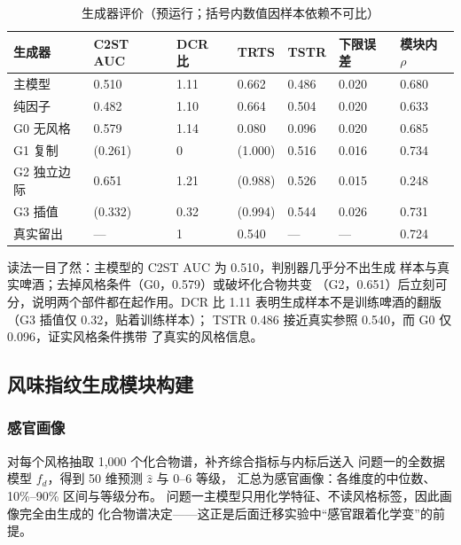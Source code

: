 \documentclass[12pt,a4paper]{article}
\begin{document}
\begin{table}[H]
  \centering\small
  \caption{生成器评价（预运行；括号内数值因样本依赖不可比）}
  \label{tab:q3_gen}
  \begin{tabularx}{\textwidth}{lYYYYYY}
    \toprule
    生成器 & C2ST AUC & DCR 比 & TRTS & TSTR & 下限误差 & 模块内 $\rho$ \\
    \midrule
    主模型 & 0.510 & 1.11 & 0.662 & 0.486 & 0.020 & 0.680 \\
    纯因子 & 0.482 & 1.10 & 0.664 & 0.504 & 0.020 & 0.633 \\
    G0 无风格 & 0.579 & 1.14 & 0.080 & 0.096 & 0.020 & 0.685 \\
    G1 复制 & (0.261) & 0 & (1.000) & 0.516 & 0.016 & 0.734 \\
    G2 独立边际 & 0.651 & 1.21 & (0.988) & 0.526 & 0.015 & 0.248 \\
    G3 插值 & (0.332) & 0.32 & (0.994) & 0.544 & 0.026 & 0.731 \\
    真实留出 & --- & 1 & 0.540 & --- & --- & 0.724 \\
    \bottomrule
  \end{tabularx}
\end{table}

读法一目了然：主模型的 C2ST AUC 为 0.510，判别器几乎分不出生成
样本与真实啤酒；去掉风格条件（G0，0.579）或破坏化合物共变
（G2，0.651）后立刻可分，说明两个部件都在起作用。DCR 比 1.11
表明生成样本不是训练啤酒的翻版（G3 插值仅 0.32，贴着训练样本）；
TSTR 0.486 接近真实参照 0.540，而 G0 仅 0.096，证实风格条件携带
了真实的风格信息。


\subsection{风味指纹生成模块构建}

\subsubsection{感官画像}

对每个风格抽取 1{,}000 个化合物谱，补齐综合指标与内标后送入
问题一的全数据模型 $f_d$，得到 50 维预测 $\hat z$ 与 0--6 等级，
汇总为感官画像：各维度的中位数、10\%--90\% 区间与等级分布。
问题一主模型只用化学特征、不读风格标签，因此画像完全由生成的
化合物谱决定——这正是后面迁移实验中``感官跟着化学变''的前提。
\end{document}
